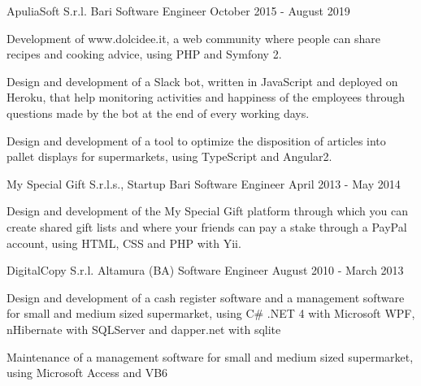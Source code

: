 \documentclass{resume} %
\begin{document}
\cvEntry
  {ApuliaSoft S.r.l.}
  {Bari}
  {Software Engineer}
  {October 2015 - August 2019}{
    \begin{cvEntryItems}
      \item Development of www.dolcidee.it, a web community where people can share recipes
            and cooking advice, using PHP and Symfony 2.
      \item Design and development of a Slack bot, written in JavaScript and deployed on
            Heroku, that help monitoring activities and happiness of the employees through
            questions made by the bot at the end of every working days.
      \item Design and development of a tool to optimize the disposition of articles into
            pallet displays for supermarkets, using TypeScript and Angular2.
    \end{cvEntryItems}
  }


\cvEntry
  {My Special Gift S.r.l.s., Startup}
  {Bari}
  {Software Engineer}
  {April 2013 - May 2014}{
    \begin{cvEntryItems}
      \item Design and development of the My Special Gift platform through which you can
            create shared gift lists and where your friends can pay a stake through a
            PayPal account, using HTML, CSS and PHP with Yii.
    \end{cvEntryItems}
  }


\cvEntry
  {DigitalCopy S.r.l.}
  {Altamura (BA)}
  {Software Engineer}
  {August 2010 - March 2013}{
    \begin{cvEntryItems}
      \item Design and development of a cash register software and a management software for
            small and medium sized supermarket, using C\# .NET 4 with Microsoft WPF, nHibernate
            with SQLServer and dapper.net with sqlite
      \item Maintenance of a management software for small and medium sized supermarket, using
            Microsoft Access and VB6
    \end{cvEntryItems}
  }

\end{document}
